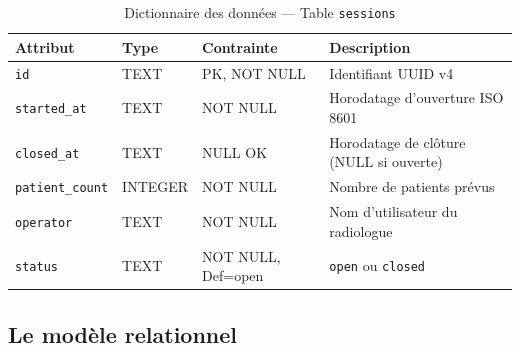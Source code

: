\documentclass[12pt, a4paper]{report}
\begin{document}
\begin{table}[H]
\centering
\caption{Dictionnaire des données --- Table \texttt{sessions}}
\begin{tabularx}{\textwidth}{L{3cm} L{2.5cm} L{2cm} X}
\toprule
\textbf{Attribut} & \textbf{Type} & \textbf{Contrainte} & \textbf{Description} \\
\midrule
\texttt{id}             & TEXT    & PK, NOT NULL      & Identifiant UUID v4 \\
\texttt{started\_at}    & TEXT    & NOT NULL          & Horodatage d'ouverture ISO 8601 \\
\texttt{closed\_at}     & TEXT    & NULL OK           & Horodatage de clôture (NULL si ouverte) \\
\texttt{patient\_count} & INTEGER & NOT NULL          & Nombre de patients prévus \\
\texttt{operator}       & TEXT    & NOT NULL          & Nom d'utilisateur du radiologue \\
\texttt{status}         & TEXT    & NOT NULL, Def=open& \texttt{open} ou \texttt{closed} \\
\bottomrule
\end{tabularx}
\end{table}

\subsection{Le modèle relationnel}
\end{document}

